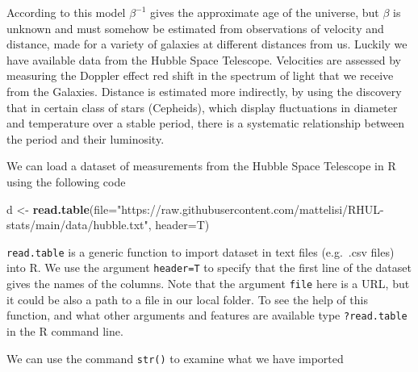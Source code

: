 \documentclass[
]{book}
\newenvironment{Shaded}{\begin{snugshade}}{\end{snugshade}}
\newcommand{\AttributeTok}[1]{\textcolor[rgb]{0.13,0.29,0.53}{#1}}
\newcommand{\CommentTok}[1]{\textcolor[rgb]{0.56,0.35,0.01}{\textit{#1}}}
\newcommand{\FunctionTok}[1]{\textcolor[rgb]{0.13,0.29,0.53}{\textbf{#1}}}
\newcommand{\NormalTok}[1]{#1}
\newcommand{\OtherTok}[1]{\textcolor[rgb]{0.56,0.35,0.01}{#1}}
\newcommand{\StringTok}[1]{\textcolor[rgb]{0.31,0.60,0.02}{#1}}
\begin{document}
According to this model \(\beta^{-1}\) gives the approximate age of the universe, but \(\beta\) is unknown and must somehow be estimated from observations of \(\text{velocity}\) and \(\text{distance}\), made for a variety of galaxies at different distances from us. Luckily we have available data from the Hubble Space Telescope. Velocities are assessed by measuring the Doppler effect red shift in the spectrum of light that we receive from the Galaxies. Distance is estimated more indirectly, by using the discovery that in certain class of stars (Cepheids), which display fluctuations in diameter and temperature over a stable period, there is a systematic relationship between the period and their luminosity.

We can load a dataset of measurements from the Hubble Space Telescope in R using the following code

\begin{Shaded}
\begin{Highlighting}[]
\NormalTok{d }\OtherTok{\textless{}{-}} \FunctionTok{read.table}\NormalTok{(}\AttributeTok{file=}\StringTok{"https://raw.githubusercontent.com/mattelisi/RHUL{-}stats/main/data/hubble.txt"}\NormalTok{, }
                \AttributeTok{header=}\NormalTok{T)}
\end{Highlighting}
\end{Shaded}

\texttt{read.table} is a generic function to import dataset in text files (e.g.~.csv files) into R. We use the argument \texttt{header=T} to specify that the first line of the dataset gives the names of the columns. Note that the argument \texttt{file} here is a URL, but it could be also a path to a file in our local folder. To see the help of this function, and what other arguments and features are available type \texttt{?read.table} in the R command line.

We can use the command \texttt{str()} to examine what we have imported

\begin{Shaded}
\end{Shaded}
\end{document}
